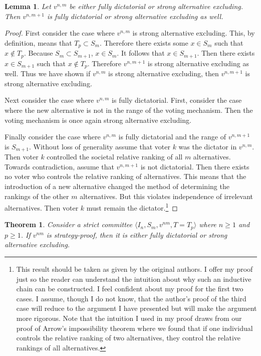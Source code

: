 \documentclass{amsart}
\newtheorem{theorem}{Theorem}
\newtheorem{lemma}{Lemma}
\theoremstyle{plain}
\begin{document}
\begin{lemma}
    Let $v^{n,m}$ be either fully dictatorial or strong alternative excluding. Then $v^{n,m+1}$ is fully dictatorial or strong alternative excluding as well.
\end{lemma}

\begin{proof}
    First consider the case where $v^{n,m}$ is strong alternative excluding. This, by definition, means that $T_p \subset S_m$. Therefore there exists some $x \in S_m$ such that $x \notin T_p$. Because $S_m \subset S_{m+1}$, $x \in S_m$. It follows that $x \in S_{m+1}$. Then there exists $x \in S_{m+1}$ such that $x \notin T_p$. Therefore $v^{n,m+1}$ is strong alternative excluding as well. Thus we have shown if $v^{n,m}$ is strong alternative excluding, then $v^{n,m+1}$ is strong alternative excluding.

    Next consider the case where $v^{n,m}$ is fully dictatorial. First, consider the case where the new alternative is not in the range of the voting mechanism. Then the voting mechanism is once again strong alternative excluding. 

    Finally consider the case where $v^{n,m}$ is fully dictatorial and the range of $v^{n,m+1}$ is $S_{m+1}$. Without loss of generality assume that voter $k$ was the dictator in $v^{n,m}$. Then voter $k$ controlled the societal relative ranking of all $m$ alternatives. Towards contradiction, assume that $v^{n,m+1}$ is not dictatorial. Then there exists no voter who controls the relative ranking of alternatives. This means that the introduction of a new alternative changed the method of determining the rankings of the other $m$ alternatives. But this violates independence of irrelevant alternatives. Then voter $k$ must remain the dictator.\footnote{This result should be taken as given by the original authors. I offer my proof just so the reader can understand the intuition about why such an inductive chain can be constructed. I feel confident about my proof for the first two cases. I assume, though I do not know, that the author's proof of the third case will reduce to the argument I have presented but will make the argument more rigorous. Note that the intuition I used in my proof draws from our proof of Arrow's impossibility theorem where we found that if one individual controls the relative ranking of two alternatives, they control the relative rankings of all alternatives.}
\end{proof}

\begin{theorem}
    Consider a strict committee $\langle I_n, S_m, v^{nm}, T = T_p \rangle$ where $n \ge 1$ and $p \ge 1$. 
    If $v^{nm}$ is strategy-proof, then it is either fully dictatorial or strong alternative excluding.
\end{theorem}
\end{document}

